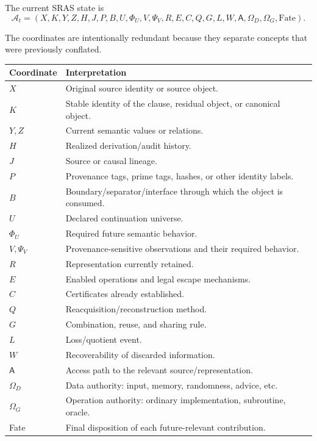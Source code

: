 \documentclass[11pt]{article}
\theoremstyle{plain}
\theoremstyle{definition}
\theoremstyle{remark}
\begin{document}
The current SRAS state is
\[
\mathcal A_t=
(X,K,Y,Z,H,J,P,B,U,\Phi_U,V,\Psi_V,R,E,C,Q,G,L,W,\mathsf A,
\Omega_D,\Omega_G,\mathrm{Fate}).
\]

The coordinates are intentionally redundant because they separate concepts
that were previously conflated.

\begin{longtable}{p{} p{}}
\toprule
\textbf{Coordinate} & \textbf{Interpretation}\\
\midrule
\endhead
\(X\) & Original source identity or source object.\\
\(K\) & Stable identity of the clause, residual object, or canonical object.\\
\(Y,Z\) & Current semantic values or relations.\\
\(H\) & Realized derivation/audit history.\\
\(J\) & Source or causal lineage.\\
\(P\) & Provenance tags, prime tags, hashes, or other identity labels.\\
\(B\) & Boundary/separator/interface through which the object is consumed.\\
\(U\) & Declared continuation universe.\\
\(\Phi_U\) & Required future semantic behavior.\\
\(V,\Psi_V\) & Provenance-sensitive observations and their required behavior.\\
\(R\) & Representation currently retained.\\
\(E\) & Enabled operations and legal escape mechanisms.\\
\(C\) & Certificates already established.\\
\(Q\) & Reacquisition/reconstruction method.\\
\(G\) & Combination, reuse, and sharing rule.\\
\(L\) & Loss/quotient event.\\
\(W\) & Recoverability of discarded information.\\
\(\mathsf A\) & Access path to the relevant source/representation.\\
\(\Omega_D\) & Data authority: input, memory, randomness, advice, etc.\\
\(\Omega_G\) & Operation authority: ordinary implementation, subroutine, oracle.\\
Fate & Final disposition of each future-relevant contribution.\\
\bottomrule
\end{longtable}
\end{document}
